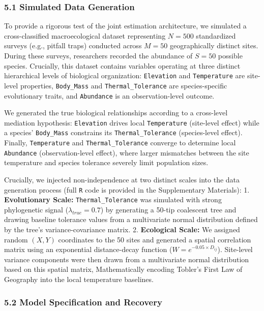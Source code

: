 \documentclass[
]{article}
\begin{document}
\subsubsection{5.1 Simulated Data Generation}\label{simulated-data-generation}

To provide a rigorous test of the joint estimation architecture, we simulated a cross-classified macroecological dataset representing \(N=500\) standardized surveys (e.g., pitfall traps) conducted across \(M=50\) geographically distinct sites. During these surveys, researchers recorded the abundance of \(S=50\) possible species. Crucially, this dataset contains variables operating at three distinct hierarchical levels of biological organization: \texttt{Elevation} and \texttt{Temperature} are site-level properties, \texttt{Body\_Mass} and \texttt{Thermal\_Tolerance} are species-specific evolutionary traits, and \texttt{Abundance} is an observation-level outcome.

We generated the true biological relationships according to a cross-level mediation hypothesis: \texttt{Elevation} drives local \texttt{Temperature} (site-level effect) while a species' \texttt{Body\_Mass} constrains its \texttt{Thermal\_Tolerance} (species-level effect). Finally, \texttt{Temperature} and \texttt{Thermal\_Tolerance} converge to determine local \texttt{Abundance} (observation-level effect), where larger mismatches between the site temperature and species tolerance severely limit population sizes.

Crucially, we injected non-independence at two distinct scales into the data generation process (full \texttt{R} code is provided in the Supplementary Materials):
1. \textbf{Evolutionary Scale:} \texttt{Thermal\_Tolerance} was simulated with strong phylogenetic signal (\(\lambda_{true} = 0.7\)) by generating a 50-tip coalescent tree and drawing baseline tolerance values from a multivariate normal distribution defined by the tree's variance-covariance matrix.
2. \textbf{Ecological Scale:} We assigned random \((X,Y)\) coordinates to the 50 sites and generated a spatial correlation matrix using an exponential distance-decay function (\(W = e^{-0.05 \times D_{ij}}\)). Site-level variance components were then drawn from a multivariate normal distribution based on this spatial matrix, Mathematically encoding Tobler's First Law of Geography into the local temperature baselines.

\subsubsection{5.2 Model Specification and Recovery}\label{model-specification-and-recovery}
\end{document}

